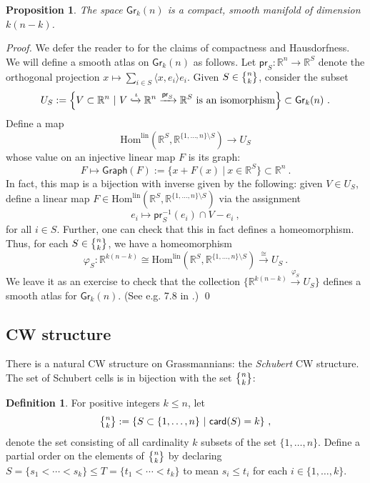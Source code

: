 \documentclass{article}
\newcommand{\bb}[1]{\mathbb{#1}}
\newcommand{\msf}[1]{\mathsf{#1}}
\newcommand{\gr}{\msf{Gr}}
\newcommand{\pr}{\msf{pr}}
\newcommand{\lhom}{\text{Hom}^\text{lin}}
\newcommand{\graph}{\msf{Graph}}
\newcommand{\nchoosek}{\textstyle\genfrac{\lbrace}{\rbrace}{0pt}{}}
\newcommand{\card}{\msf{card}}
\newtheorem{proposition}[theorem]{Proposition}
\theoremstyle{definition}
\newtheorem{definition}[theorem]{Definition}
\begin{document}
\begin{proposition}
    The space $\gr_k(n)$ is a compact, smooth manifold of dimension $k(n-k)$. 
\end{proposition}
{\it Proof.} We defer the reader to \cite{characteristic} for the claims of compactness and Hausdorfness. 
We will define a smooth atlas on $\gr_k(n)$ as follows. Let $\pr_S: \bb{R}^n \to \bb{R}^S$
denote the orthogonal projection $x \mapsto \sum_{i \in S} \langle x,e_i\rangle e_i$.
Given $S \in \nchoosek{n}{k}$, consider the subset
$$U_S := \left\{ V \subset \bb{R}^n ~|~ V \xhookrightarrow{\iota} \bb{R}^n \xrightarrow{\pr_S} \bb{R}^S
    \text{ is an isomorphism}\right\} \subset \gr_k(n)~.$$
Define a map
$$\lhom(\bb{R}^S, \bb{R}^{\{1, \dots, n\} \setminus S}) \to U_S$$
whose value on an injective linear map $F$ is its graph:
$$F \mapsto \graph(F) := \{x+F(x) ~|~ x \in \bb{R}^S\} \subset \bb{R}^n~.$$
In fact, this map is a bijection with inverse given by the following:
given $V \in U_S$, define a linear map $F \in \lhom(\bb{R}^S, \bb{R}^{\{1, \dots, n\} \setminus S})$
via the assignment
$$e_i \mapsto \pr_S^{-1}(e_i) \cap V - e_i~,$$
for all $i \in S$.
Further, one can check that this in fact defines a homeomorphism. 
Thus, for each $S \in \nchoosek{n}{k}$,
we have a homeomorphism
$$\varphi_S: \bb{R}^{k(n-k)} \cong \lhom(\bb{R}^S, \bb{R}^{\{1, \dots, n\} \setminus S}) \xrightarrow{\cong}
    U_S~.$$
We leave it as an exercise to check that the collection $\{\bb{R}^{k(n-k)} \xrightarrow{\varphi_S} U_S\}$ 
defines a smooth atlas for $\gr_k(n)$. (See e.g. 7.8 in \cite{manifolds}.) 
\qed \\

\subsection{CW structure}\label{cell}
There is a natural CW structure on Grassmannians: the \emph{Schubert} CW structure. The set of Schubert cells
is in bijection with the set $\nchoosek{n}{k}$: 
\begin{definition}\label{nchoosek}
    For positive integers $k\le n$, let 
    $$\nchoosek{n}{k}:= \{S \subset \{1,\dots,n\} ~|~ \card(S) = k\}~,$$
    denote the set consisting of all cardinality $k$ subsets of the set $\{1,\dots,n\}$.
    Define a partial order on the elements of $\nchoosek{n}{k}$ by declaring 
    $S = \{s_1<\cdots<s_k\}\leq T = \{t_1<\cdots<t_k\}$ to mean $s_i\leq t_i$ for each $i\in\{1,\dots,k\}$.
\end{definition}
\end{document}
